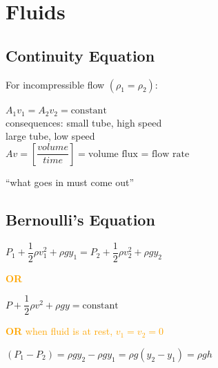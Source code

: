 \chapter*{Fluids}
\section*{Continuity Equation}
  For incompressible flow $(\rho_1 = \rho_2)$:\\\\
    $A_1 v_1 = A_2 v_2 = \text{constant}$\\

  \noindent consequences: small tube, high speed\\
  \hspace*{21.5mm} large tube, low speed\\

  \begin{equation*}
      Av = \left[ \frac{volume}{time} \right] = \text{volume flux = flow rate}
    \phantom{\hspace{10cm}}
  \end{equation*}

  \noindent ``what goes in must come out''

  \section*{Bernoulli's Equation}
  \begin{equation*}
      P_1 + \frac{1}{2} \rho v^2_1 + \rho g y_1 = P_2 + \frac{1}{2} \rho v^2_2 + \rho g y_2
    \phantom{\hspace{10cm}}
  \end{equation*}

  \hspace*{5mm} \noindent \textcolor{orange}{\bf{OR}}

  \begin{equation*}
      P + \frac{1}{2} \rho v^2 + \rho g y = \text{constant}
    \phantom{\hspace{12cm}}
  \end{equation*}

  \hspace*{5mm} \noindent \textcolor{orange}{\textbf{OR} when fluid is at rest, $v_1 = v_2 = 0$}

  \begin{equation*}
      (P_1 - P_2) = \rho gy_2 - \rho gy_1 = \rho g(y_2 - y_1) = \rho gh
    \phantom{\hspace{12cm}}
  \end{equation*}

